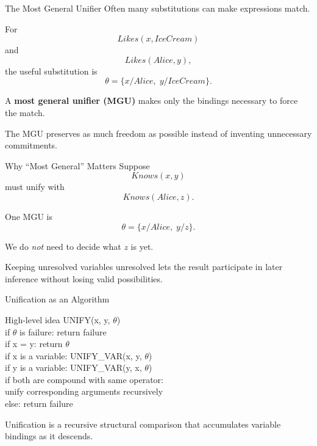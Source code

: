 \documentclass[aspectratio=169,10pt]{beamer}
\begin{document}
\begin{frame}[shrink=10]{The Most General Unifier}
  Often many substitutions can make expressions match.

  For
  \[
    Likes(x,IceCream)
  \]
  and
  \[
    Likes(Alice,y),
  \]
  the useful substitution is
  \[
    \theta = \{x/Alice,\;y/IceCream\}.
  \]

  A \textbf{most general unifier (MGU)} makes only the bindings necessary to force the match.

  \begin{keyidea}
    The MGU preserves as much freedom as possible instead of inventing unnecessary commitments.
  \end{keyidea}
\end{frame}

\begin{frame}[shrink=10]{Why ``Most General'' Matters}
  Suppose
  \[
    Knows(x,y)
  \]
  must unify with
  \[
    Knows(Alice,z).
  \]

  One MGU is
  \[
    \theta = \{x/Alice,\;y/z\}.
  \]

  We do \emph{not} need to decide what $z$ is yet.

  \begin{keyidea}
    Keeping unresolved variables unresolved lets the result participate in later inference without losing valid possibilities.
  \end{keyidea}
\end{frame}

\begin{frame}[shrink=12]{Unification as an Algorithm}
  \begin{block}{High-level idea}
  \ttfamily\small
  UNIFY(x, y, $\theta$)\\
  \quad if $\theta$ is failure: return failure\\
  \quad if x = y: return $\theta$\\
  \quad if x is a variable: UNIFY\_VAR(x, y, $\theta$)\\
  \quad if y is a variable: UNIFY\_VAR(y, x, $\theta$)\\
  \quad if both are compound with same operator:\\
  \qquad unify corresponding arguments recursively\\
  \quad else: return failure
  \end{block}

  \begin{keyidea}
    Unification is a recursive structural comparison that accumulates variable bindings as it descends.
  \end{keyidea}
\end{frame}
\end{document}
